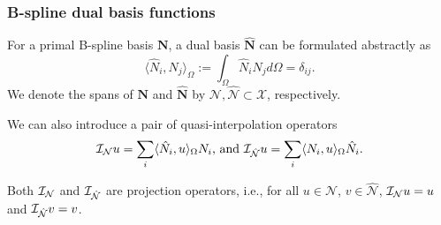 \subsubsection{B-spline dual basis functions}
For a primal B-spline basis $\mathbf{N}$, a dual basis $\hat{\mathbf{N}}$ can be formulated abstractly as
\begin{equation}
	\langle\hat{N}_i,N_j\rangle_\Omega:=\int_\Omega\hat{N}_iN_jd\Omega=\delta_{ij}.
\end{equation}
We denote the spans of ${\mathbf{N}}$ and $\hat{\mathbf{N}}$ by $\mathcal{N},\hat{\mathcal{N}}\subset\mathcal{X}$, respectively.


We can also introduce a pair of quasi-interpolation operators
\begin{equation}
	\mathcal{I}_\mathcal{N}u = \sum_i\langle{\hat{N}_i,u}\rangle_\Omega{N}_i\text{, and }\mathcal{I}_{\hat{\mathcal{N}}}u = \sum_i\langle{{N}_i,u}\rangle_\Omega\hat{N}_i.\label{eq:quasi-interpolation-operators}
\end{equation}
\begin{remark}
	Both $\mathcal{I}_\mathcal{N}$ and $\mathcal{I}_{\hat{\mathcal{N}}}$ are projection operators, i.e., for all $u\in\mathcal{N}$, $v\in\hat{\mathcal{N}}$, $\mathcal{I}_\mathcal{N}u=u$ and $\mathcal{I}_{\hat{\mathcal{N}}}v=v$.
\end{remark}

